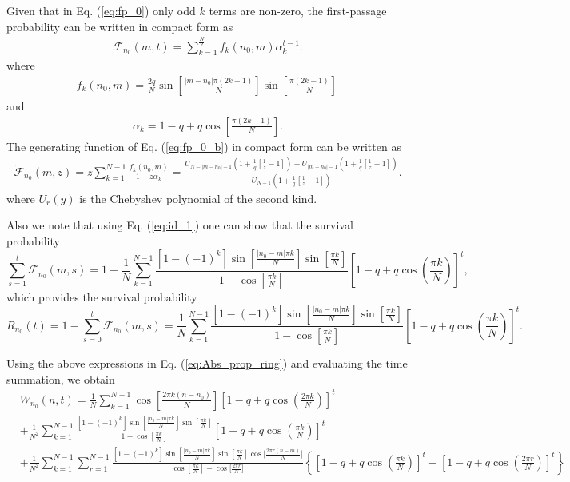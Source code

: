 \documentclass[idelinks, superscriptaddress, amsmath, amssymb, aps, pre]{revtex4-2}
\begin{document}
Given that in Eq. (\ref{eq:fp_0}) only odd $k$ terms are non-zero, the first-passage probability can be written in compact form as
\begin{align}
\mathcal{F}_{n_0}(m,t)=\sum_{k=1}^{\frac{N}{2}}f_{k}(n_0,m)\alpha_k^{t-1}.
\label{eq:fp_0_b}
\end{align}
where
\begin{align}
f_k(n_0,m)=\frac{2q}{N}\sin\left[\frac{|m-n_0|\pi (2k-1)}{N}\right]\sin\left[\frac{\pi (2k-1)}{N}\right]\,
\label{eq:fn0m}
\end{align}
and
\begin{align}
\alpha_{k}=1-q+q\cos\left[\frac{\pi(2k-1)}{N}\right].
\label{eq:alpha_k}
\end{align}
The generating function of Eq. (\ref{eq:fp_0_b}) in compact form can be written as
\begin{align}
\widetilde{\mathcal{F}}_{n_0}(m,z)=z\sum_{k=1}^{N-1}\frac{f_k(n_0,m)}{1-z\alpha_k}=\frac{U_{N-|m-n_0|-1}\left(1+\frac{1}{q}\left[\frac{1}{z}-1\right]\right)+U_{|m-n_0|-1}\left(1+\frac{1}{q}\left[\frac{1}{z}-1\right]\right)}{U_{N-1}\left(1+\frac{1}{q}\left[\frac{1}{z}-1\right]\right)}.
\label{eq:fp_0_z}
\end{align}
where $U_r(y)$ is the Chebyshev polynomial of the second kind.


Also we note that using Eq. (\ref{eq:id_1}) one can show that the survival probability $$\sum_{s=1}^t \mathcal{F}_{n_0}(m,s)=1-\frac{1}{N}\sum_{k=1}^{N-1}\frac{\left[1-(-1)^k\right]\sin\left[\frac{|n_0-m|\pi k}{N}\right]\sin\left[\frac{\pi k}{N}\right]}{1-\cos\left[\frac{\pi k}{N}\right]}\left[1-q+q\cos\left(\frac{\pi k}{N}\right)\right]^{t},$$ which provides the survival probability $$R_{n_0}(t)=1-\sum_{s=0}^t \mathcal{F}_{n_0}(m,s)=\frac{1}{N}\sum_{k=1}^{N-1}\frac{\left[1-(-1)^k\right]\sin\left[\frac{|n_0-m|\pi k}{N}\right]\sin\left[\frac{\pi k}{N}\right]}{1-\cos\left[\frac{\pi k}{N}\right]}\left[1-q+q\cos\left(\frac{\pi k}{N}\right)\right]^{t}.$$

Using the above expressions in Eq. (\ref{eq:Abs_prop_ring}) and evaluating the time summation, we obtain
\begin{align}
&W_{n_0}(n,t)=\frac{1}{N}\sum_{k=1}^{N-1}\cos\left[\frac{2\pi k (n-n_0)}{N}\right]\left[1-q+q\cos\left(\frac{2\pi k}{N}\right)\right]^t\nonumber \\
&+\frac{1}{N^2}\sum_{k=1}^{N-1}\frac{\left[1-(-1)^k\right]\sin\left[\frac{|n_0-m|\pi k}{N}\right]\sin\left[\frac{\pi k}{N}\right]}{1-\cos\left[\frac{\pi k}{N}\right]}\left[1-q+q\cos\left(\frac{\pi k}{N}\right)\right]^{t}\nonumber \\
&+\frac{1}{N^2}\sum_{k=1}^{N-1}\sum_{r=1}^{N-1}\frac{\left[1-(-1)^k\right]\sin\left[\frac{|n_0-m|\pi k}{N}\right]\sin\left[\frac{\pi k}{N}\right]\cos\Big[\frac{2\pi r (n-m)}{N}\Big]}{\cos\left[\frac{\pi k}{N}\right]-\cos\Big[\frac{2\pi r}{N}\Big]}\left\{\left[1-q+q\cos\left(\frac{\pi k}{N}\right)\right]^t-\left[1-q+q\cos\left(\frac{2\pi r}{N}\right)\right]^t\right\}
\end{align}
\end{document}
